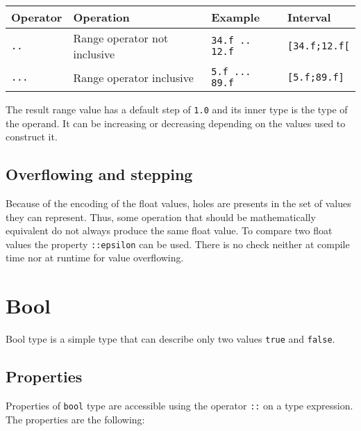 \begin{itemize}
  \begin{center}
    \vspace{-20pt}
    \begin{adjustbox}{max width=1.0\linewidth}
      \begin{tabular}{|l|lll|}
        \hline
        Operator & Operation & Example & Interval\\[0pt]
        \hline
        \hline
        \texttt{..} & Range operator not inclusive & \texttt{34.f .. 12.f} & \texttt{[34.f;12.f[}\\[0pt]
            \texttt{...} & Range operator inclusive & \texttt{5.f ... 89.f} & \texttt{[5.f;89.f]}\\[0pt]
            \hline
      \end{tabular}
    \end{adjustbox}
  \end{center}


  The result range value has a default step of \texttt{1.0} and its inner type is the
  type of the operand. It can be increasing or decreasing depending on the
  values used to construct it.

\end{itemize}

\subsection{Overflowing and stepping}
\label{sec:orgd5d9f51}

Because of the encoding of the float values, holes are presents in the set of
values they can represent. Thus, some operation that should be mathematically
equivalent do not always produce the same float value. To compare two float
values the property \texttt{::epsilon} can be used. There is no check neither at
compile time nor at runtime for value overflowing.


\section{Bool}
\label{sec:org9f3a743}

Bool type is a simple type that can describe only two values \texttt{true} and \texttt{false}.

\subsection{Properties}
\label{sec:org503bc9e}

Properties of \texttt{bool} type are accessible using the operator \texttt{::} on a type
expression. The properties are the following:

